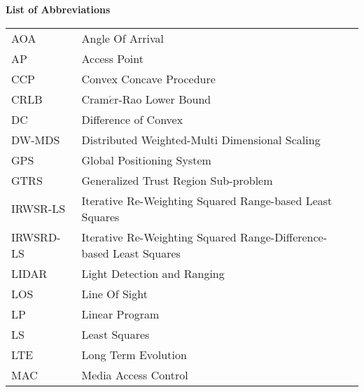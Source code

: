 \newpage


\phantom{m}

\begin{flushleft}
\begin{Huge}
\textbf{List of Abbreviations}
\end{Huge}
\end{flushleft}

\phantom{m}

\begin{longtable}[h]{l l}

AOA & Angle Of Arrival\\

AP & Access Point \\

CCP & Convex Concave Procedure \\

CRLB & Cram$\acute{e}$r-Rao  Lower  Bound \\

DC & Difference of Convex \\

DW-MDS & Distributed Weighted-Multi Dimensional Scaling \\

GPS & Global Positioning System \\

GTRS & Generalized Trust Region Sub-problem \\

IRWSR-LS & Iterative Re-Weighting Squared Range-based Least Squares \\

IRWSRD-LS & Iterative Re-Weighting Squared Range-Difference-based Least Squares\\

LIDAR & Light Detection and Ranging\\

LOS & Line Of Sight \\

LP & Linear Program \\

LS & Least Squares \\

LTE & Long Term Evolution \\

MAC & Media Access Control\\


\end{longtable}
